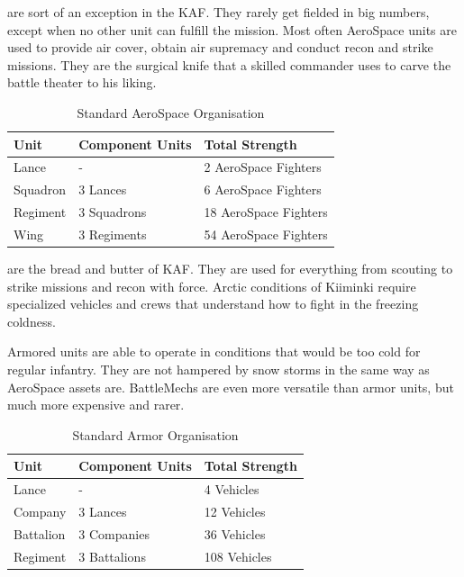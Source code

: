 \documentclass{tufte-book}
\begin{document}
 are sort of an exception in the KAF. 
They rarely get fielded in big numbers, except when no other unit can
fulfill the mission. Most often AeroSpace units are used to provide air
cover, obtain air supremacy and conduct recon and strike missions. They
are the surgical knife that a skilled commander uses to carve the battle
theater to his liking.

\bigskip
\begin{table}
\begin{minipage}{\textwidth}
\begin{center}
\begin{tabular}{lll}
\toprule
Unit & Component Units & Total Strength \\
\midrule
Lance    & -           & 2 AeroSpace Fighters \\
Squadron & 3 Lances    & 6 AeroSpace Fighters \\
Regiment & 3 Squadrons & 18 AeroSpace Fighters \\
Wing     & 3 Regiments & 54 AeroSpace Fighters \\
\bottomrule
\end{tabular}
\end{center}
\end{minipage}
\caption{Standard AeroSpace Organisation}
\end{table}

 are the bread and butter of KAF. 
They are used for everything from scouting to strike missions and recon 
with force. Arctic conditions of Kiiminki require specialized vehicles 
and crews that understand how to fight in the freezing coldness.

Armored units are able to operate in conditions that would be too cold
for regular infantry. They are not hampered by snow storms in the same
way as AeroSpace assets are. BattleMechs are even more versatile than
armor units, but much more expensive and rarer.

\bigskip
\begin{table}
\begin{minipage}{\textwidth}
\begin{center}
\begin{tabular}{lll}
\toprule
Unit & Component Units & Total Strength \\
\midrule
Lance     & -            & 4 Vehicles \\
Company   & 3 Lances     & 12 Vehicles \\
Battalion & 3 Companies  & 36 Vehicles \\
Regiment  & 3 Battalions & 108 Vehicles \\
\bottomrule
\end{tabular}
\end{center}
\end{minipage}
\caption{Standard Armor Organisation}
\end{table}
\end{document}
